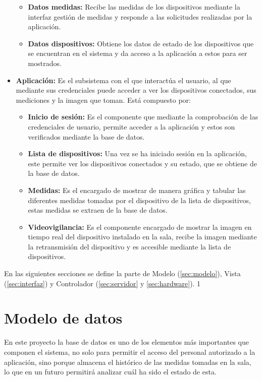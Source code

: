 \begin{itemize}
\begin{itemize}
		      \item \textbf{Datos medidas:} Recibe las medidas de los dispositivos mediante la interfaz gestión de medidas y responde a las solicitudes realizadas por la aplicación.
		      \item \textbf{Datos dispositivos:} Obtiene los datos de estado de los dispositivos que se encuentran en el sistema y da acceso a la aplicación a estos para ser mostrados.
	      \end{itemize}
	\item \textbf{Aplicación:} Es el subsistema con el que interactúa el usuario, al que mediante sus credenciales puede acceder a ver los dispositivos conectados, sus mediciones y la imagen que toman. Está compuesto por:
	      \begin{itemize}
		      \item \textbf{Inicio de sesión:} Es el componente que mediante la comprobación de las credenciales de usuario, permite acceder a la aplicación y estos son verificados mediante la base de datos.
		      \item \textbf{Lista de dispositivos:} Una vez se ha iniciado sesión en la aplicación, este permite ver los dispositivos conectados y su estado, que se obtiene de la base de datos.
		      \item \textbf{Medidas:} Es el encargado de mostrar de manera gráfica y tabular las diferentes medidas tomadas por el dispositivo de la lista de dispositivos, estas medidas se extraen de la base de datos.
		      \item \textbf{Videovigilancia:} Es el componente encargado de mostrar la imagen en tiempo real del dispositivo instalado en la sala, recibe la imagen mediante la retransmisión del dispositivo y es accesible mediante la lista de dispositivos.
	      \end{itemize}
\end{itemize}

En las siguientes secciones se define la parte de Modelo (\autoref{sec:modelo}), Vista (\autoref{sec:interfaz}) y Controlador (\autoref{sec:servidor} y \autoref{sec:hardware}).
1\pagebreak

\section{Modelo de datos}\label{sec:modelo}
En este proyecto la base de datos es uno de los elementos más importantes que componen el sistema, no solo para permitir el acceso del personal autorizado a la aplicación, sino porque almacena el histórico de las medidas tomadas en la sala, lo que en un futuro permitirá analizar cuál ha sido el estado de esta.


